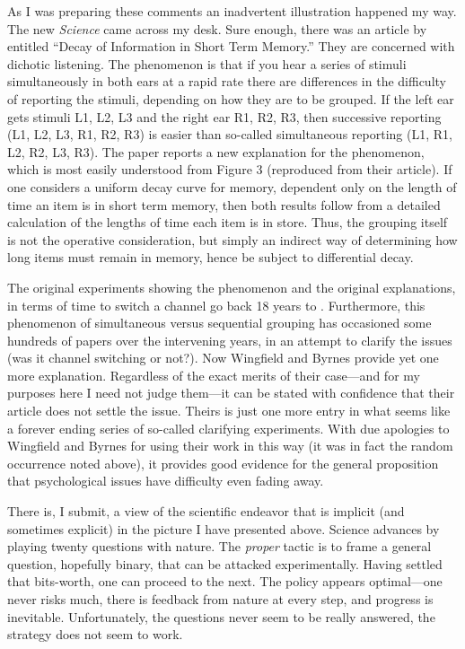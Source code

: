 \documentclass{paper}
\newcounter{oldpagecounter}
\newcommand\oldpage{\stepcounter{oldpagecounter}\marginpar{\footnotesize{\textcolor{mygrey}{pg. \arabic{oldpagecounter}}}}}
\begin{document}
As I was preparing these comments an inadvertent illustration happened my way. The new \textit{Science} came across my desk. Sure enough, there was an article by \citet{WingfieldByrnes1972} entitled ``Decay of Information in Short Term Memory.'' They are concerned with dichotic listening. The phenomenon is that if you hear a series of stimuli simultaneously in both ears at a rapid rate there are differences in the difficulty of reporting the stimuli, depending on how they are to be grouped. If the left ear gets stimuli L1, L2, L3 and the right ear R1, R2, R3, then successive reporting (L1, L2, L3, R1, R2, R3) is easier than so-called simultaneous reporting (L1, R1, L2, R2, L3, R3). The paper reports a new explanation for the phenomenon, which is most easily understood from Figure 3 (reproduced from their article). If one considers a uniform decay curve for memory, dependent only on the length of time an item is in short term memory, then both \oldpage results follow from a detailed calculation of the lengths of time each item is in store. Thus, the grouping itself is not the operative consideration, but simply an indirect way of determining how long items must remain in memory, hence be subject to differential decay. 


The original experiments showing the phenomenon and the original explanations, in terms of time to switch a channel go back 18 years to \citet{Broadbent1958}. Furthermore, this phenomenon of simultaneous versus sequential grouping has occasioned some hundreds of papers over the intervening years, in an attempt to clarify the issues (was it channel switching or not?). Now Wingfield and Byrnes provide yet one more explanation. Regardless of the exact merits of their case---and for my purposes here I need not judge them---it can be stated with confidence that their article does not settle the issue. Theirs is just one more entry in what seems like a forever ending series of so-called clarifying experiments. With due apologies to Wingfield and Byrnes for using their work in this way (it was in fact the random occurrence noted above), it provides good evidence for the general proposition that psychological issues have difficulty even fading away.

There is, I submit, a view of the scientific endeavor that is implicit (and sometimes explicit) in the picture I have presented above. Science advances by playing twenty questions with nature. The \textit{proper} tactic is to frame a general question, hopefully binary, that can be attacked experimentally. Having settled that bits-worth, one can proceed to the next. The policy appears optimal---one never risks much, there is feedback from nature at every step, and progress is inevitable. Unfortunately, the questions never seem to be really answered, the strategy does not seem to work.
\end{document}
